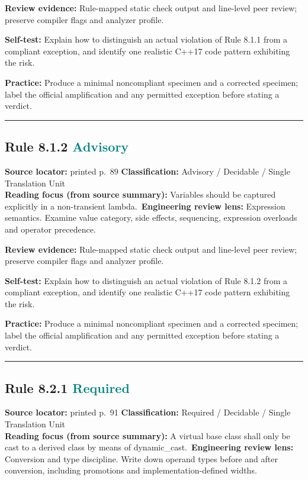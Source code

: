 \documentclass[10pt,letterpaper]{article}
\begin{document}
\textbf{Review evidence:} Rule-mapped static check output and line-level peer review; preserve compiler flags and analyzer profile.

\textbf{Self-test:} Explain how to distinguish an actual violation of Rule 8.1.1 from a compliant exception, and identify one realistic C++17 code pattern exhibiting the risk.\par
\textbf{Practice:} Produce a minimal noncompliant specimen and a corrected specimen; label the official amplification and any permitted exception before stating a verdict.
\smallskip\hrule\smallskip
\subsection*{Rule 8.1.2 \enspace \texorpdfstring{\small\textcolor{teal}{Advisory}}{Advisory}}
\noindent\textbf{Source locator:} printed p.~89 \quad\textbf{Classification:} Advisory / Decidable / Single Translation Unit\\
\textbf{Reading focus (from source summary):} Variables should be captured explicitly in a non-transient lambda.\
\textbf{Engineering review lens:} Expression semantics. Examine value category, side effects, sequencing, expression overloads and operator precedence.

\textbf{Review evidence:} Rule-mapped static check output and line-level peer review; preserve compiler flags and analyzer profile.

\textbf{Self-test:} Explain how to distinguish an actual violation of Rule 8.1.2 from a compliant exception, and identify one realistic C++17 code pattern exhibiting the risk.\par
\textbf{Practice:} Produce a minimal noncompliant specimen and a corrected specimen; label the official amplification and any permitted exception before stating a verdict.
\smallskip\hrule\smallskip
\subsection*{Rule 8.2.1 \enspace \texorpdfstring{\small\textcolor{teal}{Required}}{Required}}
\noindent\textbf{Source locator:} printed p.~91 \quad\textbf{Classification:} Required / Decidable / Single Translation Unit\\
\textbf{Reading focus (from source summary):} A virtual base class shall only be cast to a derived class by means of dynamic\_cast.\
\textbf{Engineering review lens:} Conversion and type discipline. Write down operand types before and after conversion, including promotions and implementation-defined widths.
\end{document}

